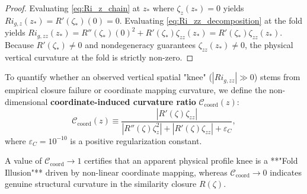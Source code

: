 \begin{proof}
Evaluating \eqref{eq:Ri_z_chain} at $z_*$ where $\zeta_z(z_*) = 0$ yields $Ri_{g,z}(z_*) = R'(\zeta_*)(0) = 0$. Evaluating \eqref{eq:Ri_zz_decomposition} at the fold yields $Ri_{g,zz}(z_*) = R''(\zeta_*)(0)^2 + R'(\zeta_*) \zeta_{zz}(z_*) = R'(\zeta_*) \zeta_{zz}(z_*)$. Because $R'(\zeta_*) \neq 0$ and nondegeneracy guarantees $\zeta_{zz}(z_*) \neq 0$, the physical vertical curvature at the fold is strictly non-zero.
\end{proof}

To quantify whether an observed vertical spatial "knee" ($|Ri_{g,zz}| \gg 0$) stems from empirical closure failure or coordinate mapping curvature, we define the non-dimensional \textbf{coordinate-induced curvature ratio} $\mathcal{C}_{\text{coord}}(z)$:
\begin{equation}
    \mathcal{C}_{\text{coord}}(z) \equiv \frac{\left| R'(\zeta) \zeta_{zz} \right|}{\left| R''(\zeta) \zeta_z^2 \right| + \left| R'(\zeta) \zeta_{zz} \right| + \varepsilon_C}, \label{eq:curvature_ratio_def}
\end{equation}
where $\varepsilon_C = 10^{-10}$ is a positive regularization constant.

A value of $\mathcal{C}_{\text{coord}} \to 1$ certifies that an apparent physical profile knee is a **"Fold Illusion"** driven by non-linear coordinate mapping, whereas $\mathcal{C}_{\text{coord}} \to 0$ indicates genuine structural curvature in the similarity closure $R(\zeta)$.